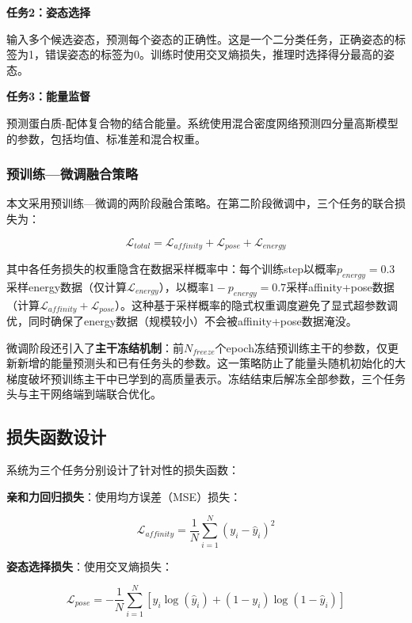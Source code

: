 \textbf{任务2：姿态选择}

输入多个候选姿态，预测每个姿态的正确性。这是一个二分类任务，正确姿态的标签为1，错误姿态的标签为0。训练时使用交叉熵损失，推理时选择得分最高的姿态。

\textbf{任务3：能量监督}

预测蛋白质-配体复合物的结合能量。系统使用混合密度网络预测四分量高斯模型的参数，包括均值、标准差和混合权重。

\subsubsection{预训练—微调融合策略}

本文采用预训练—微调的两阶段融合策略。在第二阶段微调中，三个任务的联合损失为：

\begin{equation}
\mathcal{L}_{total} = \mathcal{L}_{affinity} + \mathcal{L}_{pose} + \mathcal{L}_{energy}
\end{equation}

其中各任务损失的权重隐含在数据采样概率中：每个训练step以概率$p_{energy}=0.3$采样energy数据（仅计算$\mathcal{L}_{energy}$），以概率$1-p_{energy}=0.7$采样affinity+pose数据（计算$\mathcal{L}_{affinity}+\mathcal{L}_{pose}$）。这种基于采样概率的隐式权重调度避免了显式超参数调优，同时确保了energy数据（规模较小）不会被affinity+pose数据淹没。

微调阶段还引入了\textbf{主干冻结机制}：前$N_{freeze}$个epoch冻结预训练主干的参数，仅更新新增的能量预测头和已有任务头的参数。这一策略防止了能量头随机初始化的大梯度破坏预训练主干中已学到的高质量表示。冻结结束后解冻全部参数，三个任务头与主干网络端到端联合优化。

\subsection{损失函数设计}

系统为三个任务分别设计了针对性的损失函数：

\textbf{亲和力回归损失}：使用均方误差（MSE）损失：

\begin{equation}
\mathcal{L}_{affinity} = \frac{1}{N}\sum_{i=1}^{N}(y_i - \hat{y}_i)^2
\end{equation}

\textbf{姿态选择损失}：使用交叉熵损失：

\begin{equation}
\mathcal{L}_{pose} = -\frac{1}{N}\sum_{i=1}^{N}\left[y_i\log(\hat{y}_i) + (1-y_i)\log(1-\hat{y}_i)\right]
\end{equation}

